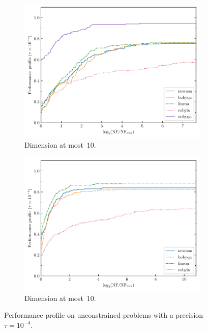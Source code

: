 \documentclass[11pt,draft]{article}
\numberwithin{equation}{section}
\begin{document}
\begin{figure}[ht]
    \begin{subfigure}{.48\textwidth}
        \centering
        \includegraphics[width=\textwidth]{pp10.pdf}
        \caption{Dimension at most~$10$.}
        \label{fig:ppu-10}
    \end{subfigure}
    \hfill
    \begin{subfigure}{.48\textwidth}
        \centering
        \includegraphics[width=\textwidth]{pp50.pdf}
        \caption{Dimension at most~$10$.}
        \label{fig:ppu-50}
    \end{subfigure}
    \caption{Performance profile on unconstrained problems with a precision~$\tau = 10^{-4}$.}
\end{figure}
\end{document}
